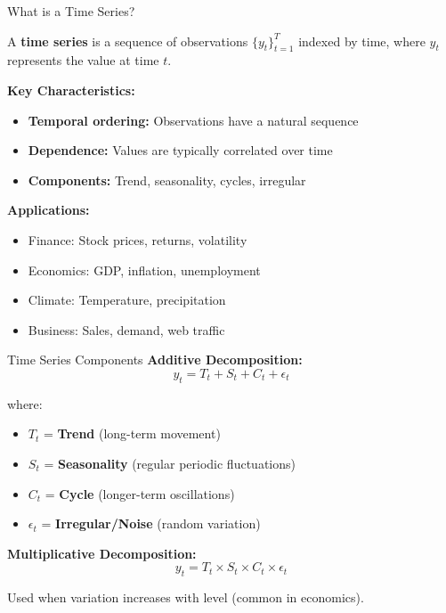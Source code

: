 \documentclass[aspectratio=169]{beamer}
\begin{document}
\begin{frame}{What is a Time Series?}
  \begin{definitionbox}[title={Time Series}]
    A \textbf{time series} is a sequence of observations $\{y_t\}_{t=1}^T$ indexed by time, where $y_t$ represents the value at time $t$.
  \end{definitionbox}

  \vspace{0.5em}

  \textbf{Key Characteristics:}
  \begin{itemize}
    \item \textbf{Temporal ordering:} Observations have a natural sequence
    \item \textbf{Dependence:} Values are typically correlated over time
    \item \textbf{Components:} Trend, seasonality, cycles, irregular
  \end{itemize}

  \vspace{0.5em}

  \textbf{Applications:}
  \begin{itemize}
    \item Finance: Stock prices, returns, volatility
    \item Economics: GDP, inflation, unemployment
    \item Climate: Temperature, precipitation
    \item Business: Sales, demand, web traffic
  \end{itemize}
\end{frame}

\begin{frame}{Time Series Components}
  \textbf{Additive Decomposition:}
  \begin{equation}
    y_t = T_t + S_t + C_t + \epsilon_t
  \end{equation}

  where:
  \begin{itemize}
    \item $T_t$ = \textbf{Trend} (long-term movement)
    \item $S_t$ = \textbf{Seasonality} (regular periodic fluctuations)
    \item $C_t$ = \textbf{Cycle} (longer-term oscillations)
    \item $\epsilon_t$ = \textbf{Irregular/Noise} (random variation)
  \end{itemize}

  \vspace{0.5em}

  \textbf{Multiplicative Decomposition:}
  \begin{equation}
    y_t = T_t \times S_t \times C_t \times \epsilon_t
  \end{equation}

  Used when variation increases with level (common in economics).
\end{frame}
\end{document}
